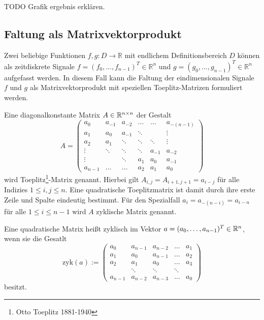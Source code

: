 TODO Grafik ergebnis erklären.

\subsection{Faltung als Matrixvektorprodukt}
\label{abs:conv_using_sparse}
Zwei beliebige Funktionen $f,g: D \rightarrow \mathbb{R}$ mit endlichem Definitionsbereich $D$ können als zeitdiskrete Signale $f=(f_0, \ldots, f_{n-1})^T \in \mathbb{R}^{n}$ und $g=(g_0, \ldots, g_{n-1})^T \in \mathbb{R}^{n}$ aufgefasst werden. %
In diesem Fall kann die Faltung der eindimensionalen Signale $f$ und $g$ als Matrixvektorprodukt mit speziellen Toeplitz-Matrizen formuliert werden. 

\begin{defi}
    \label{def:toeplitzM}
    Eine diagonalkonstante Matrix $A \in \mathbb{R}^{n \times n}$ der Gestalt
    \begin{equation*}
    A=
    \begin{pmatrix}
        a_0 & a_{-1} &a_{-2} &\ldots &\ldots &a_{-(n-1)} \\ 
        a_1 & a_0 &a_{-1} &\ddots & &\vdots \\
        a_2 & a_1 &\ddots &\ddots &\ddots &\vdots\\
        \vdots & \ddots &\ddots &\ddots &a_{-1} &a_{-2}\\
        \vdots & &\ddots &a_1 &a_0 &a_{-1} \\
        a_{n-1} &\ldots &\ldots &a_{2} &a_{1} &a_0
    \end{pmatrix}
\end{equation*}
    wird Toeplitz\footnote{Otto Toeplitz 1881-1940}-Matrix genannt. Hierbei gilt $A_{i,j}=A_{i+1,j+1}=a_{i-j}$ für alle Indizies $1 \leq i, j \leq n$. Eine quadratische Toeplitzmatrix ist damit durch ihre erste Zeile und Spalte eindeutig bestimmt. Für den Spezialfall $a_i=a_{-(n-i)}=a_{i-n}$ für alle $1 \leq i \leq n-1$ wird $A$ zyklische Matrix genannt.
\end{defi}

\begin{defi}
    \label{def:zykM}
    Eine quadratische Matrix heißt zyklisch im Vektor $a=(a_0, \ldots, a_{n-1})^T \in \mathbb{R}^n$, wenn sie die Gesatlt
    \begin{equation*}
        \mathrm{zyk}(a):=
        \begin{pmatrix}
            a_0 & a_{n-1} &a_{n-2} &\ldots &a_1 \\ 
            a_1 & a_0 &a_{n-1} & \ldots &a_2 \\
            a_2 & a_1 &a_0 & \ldots &a_3 \\
             &\ddots &\ddots &\ddots & \\
            a_{n-1} &a_{n-2} &a_{n-3} &\ldots &a_0
        \end{pmatrix}
    \end{equation*}
    besitzt.
\end{defi}    
    
